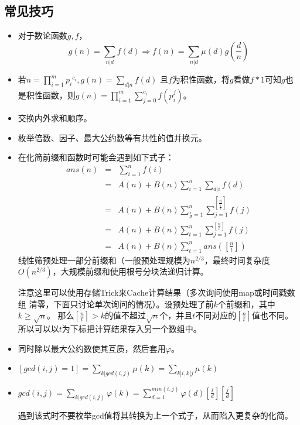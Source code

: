 \subsection{常见技巧}
\begin{itemize}
	\item
	      对于数论函数$g,f$，
	      \begin{displaymath}
		      g(n)=\sum_{n|d}{f(d)}\Rightarrow
		      f(n)=\sum_{n|d}{\mu(d)g(\frac{d}{n})}
	      \end{displaymath}
	\item
	      若$\displaystyle n=\prod_{i=1}^m{{p_i}^{c_i}},g(n)=\sum_{d|n}{f(d)}$
	      且$f$为积性函数，将$g$看做$f*1$可知$g$也是积性函数，则$\displaystyle
		      g(n)=\prod_{i=1}^m{\sum_{j=0}^{c_i}{f(p_i^j)}}$。
	\item 交换内外求和顺序。
	\item 枚举倍数、因子、最大公约数等有共性的值并换元。
	\item 在化简前缀和函数时可能会遇到如下式子：
	      \begin{eqnarray*}
		      ans(n)&=&\sum_{i=1}^n{f(i)}\\
		      &=&A(n)+B(n)\sum_{i=1}^n{\sum_{d|i}{f(d)}}\\
		      &=&A(n)+B(n)\sum_{\frac{i}{d}=1}^n{\sum_{j=1}^{\left[\frac{n}{\frac{i}{d}}\right]}{f(j)}}\\
		      &=&A(n)+B(n)\sum_{t=1}^n{\sum_{j=1}^{[\frac{n}{t}]}{f(j)}}\\
		      &=&A(n)+B(n)\sum_{t=1}^n{ans([\frac{n}{t}])}
	      \end{eqnarray*}
	      线性筛预处理一部分前缀和（一般预处理规模为$n^{2/3}$，最终时间复杂度
	      $O(n^{2/3})$，大规模前缀和使用根号分块法递归计算。

	      注意这里可以使用存储Trick来Cache计算结果（多次询问使用map或时间戳数组
	      清零，下面只讨论单次询问的情况）。设预处理了前$k$个前缀和，其中$k\geq \sqrt{n}$。
		那么$[\frac{n}{t}]>k$的值不超过$\sqrt{n}$个，并且$t$不同对应的$[\frac{n}{t}]$值也不同。
		所以可以以$t$为下标把计算结果存入另一个数组中。
	\item 同时除以最大公约数使其互质，然后套用$\varphi$。
	\item $\displaystyle [gcd(i,j)=1]=\sum_{k|gcd(i,j)}\mu(k)=\sum_{k|i,k|j}\mu(k)$
	\item $\displaystyle gcd(i,j)=\sum_{k|gcd(i,j)}{\varphi(k)}=\sum_{d=1}^{min(i,j)}{\varphi(d)[\frac{i}{d}][\frac{j}{d}]}$

		遇到该式时不要枚举gcd值将其转换为上一个式子，从而陷入更复杂的化简。


\end{itemize}
